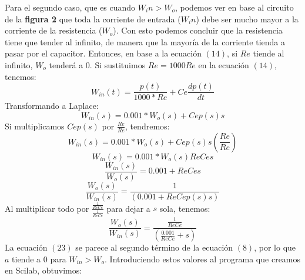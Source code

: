 \documentclass[letterpaper]{article}
\begin{document}
	\FloatBarrier
	Para el segundo caso, que es cuando \textbf{$ W_in>W_o $}, podemos ver en base al circuito de la \textbf{figura 2} que toda la corriente de entrada ($ W_in $) debe ser mucho mayor a la corriente de la resistencia ($ W_o $). Con esto podemos concluir que la resistencia tiene que tender al infinito, de manera que la mayoría de la corriente tienda a pasar por el capacitor.
	Entonces, en base a la ecuación $ (14) $, si $ Re $ tiende al infinito, $ W_o $ tenderá a $ 0 $. Si sustituimos $ Re=1000Re $ en la ecuación $ (14) $, tenemos:
	\begin{equation}
	W_{in}(t)=\frac{p(t)}{1000*Re}+Ce\frac{dp(t)}{dt}	
	\end{equation}
	Transformando a Laplace:
	\begin{equation}
	W_{in}(s)=0.001*W_o(s)+Cep(s)s
	\end{equation}
	Si multiplicamos $ Cep(s) $ por $ \frac{Re}{Re} $, tendremos:
	\begin{equation}
	W_{in}(s)=0.001*W_o(s)+Cep(s)s(\frac{Re}{Re})
	\end{equation}
	\begin{equation}
	W_{in}(s)=0.001*W_o(s)ReCes
	\end{equation}
	\begin{equation}
	\frac{W_{in}(s)}{W_o(s)}=0.001+ReCes
	\end{equation}
	\begin{equation}
	\frac{W_o(s)}{W_{in}(s)}=\frac{1}{(0.001+ReCep(s)s)}
	\end{equation}
	Al multiplicar todo por $ \frac{\frac{1}{ReCe}}{\frac{1}{ReCe}} $ para dejar a $ s $ sola, tenemos:
	\begin{equation}
	\frac{W_o(s)}{W_{in}(s)}=\frac{\frac{1}{ReCe}}{(\frac{0.001}{ReCe}+s)}
	\end{equation}
	La ecuación $ (23) $ se parece al segundo término de la ecuación $ (8) $, por lo que $ a $ tiende a $ 0 $ para $ W_{in}>W_o $. Introduciendo estos valores al programa que creamos en Scilab, obtuvimos:
\end{document}
